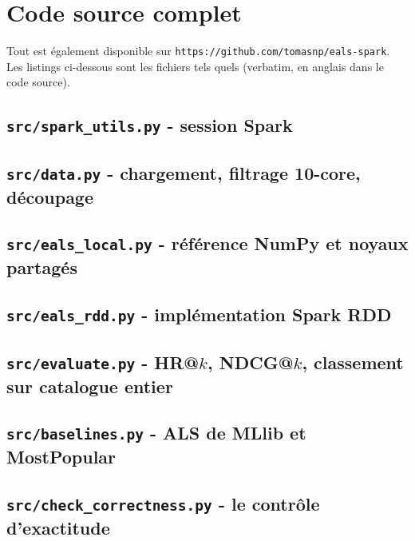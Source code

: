 
\appendix
\section{Code source complet}\label{app:code}

Tout est également disponible sur \texttt{https://github.com/tomasnp/eals-spark}. Les
listings ci-dessous sont les fichiers tels quels (verbatim, en anglais dans le code
source).

\subsection{\texttt{src/spark\_utils.py} - session Spark}


\subsection{\texttt{src/data.py} - chargement, filtrage 10-core, découpage}


\subsection{\texttt{src/eals\_local.py} - référence NumPy et noyaux partagés}


\subsection{\texttt{src/eals\_rdd.py} - implémentation Spark RDD}


\subsection{\texttt{src/evaluate.py} - HR@$k$, NDCG@$k$, classement sur catalogue entier}


\subsection{\texttt{src/baselines.py} - ALS de MLlib et MostPopular}


\subsection{\texttt{src/check\_correctness.py} - le contrôle d'exactitude}


